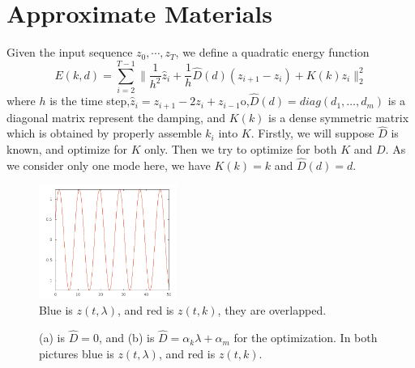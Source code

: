 \documentclass[twocolumn,a4paper]{article}
\begin{document}
\section{Approximate Materials}
Given the input sequence $z_0,\cdots,z_T$, we define a quadratic energy function
\begin{equation} \label{qua-en}
  E(k,d) = \sum_{i=2}^{T-1} \|\frac{1}{h^2}\hat{z}_i+\frac{1}{h}\hat{D}(d)(z_{i+1}-z_{i})+ K(k)z_i\|_2^2
\end{equation}
where $h$ is the time step,$\hat{z}_i=z_{i+1}-2z_{i}+z_{i-1}$o,$\hat{D}(d) =
diag(d_1,\dots,d_m)$ is a diagonal matrix represent the damping, and $K(k)$ is a
dense symmetric matrix which is obtained by properly assemble $k_i$ into
$K$. Firstly, we will suppose $\hat{D}$ is known, and optimize for $K$
only. Then we try to optimize for both $K$ and $D$. As we consider only one mode
here, we have $K(k)=k$ and $\hat{D}(d)=d$.

\begin{figure}
  \centering
  \includegraphics[width=0.4\textwidth]{./figures/singleModeNoDamp.png}
  \caption{Blue is $z(t,\lambda)$, and red is $z(t,k)$, they are overlapped.}
  \label{singleModeNoCon}
\end{figure}
\begin{figure}
  \centering
  \caption{(a) is $\hat{D}=0$, and (b) is $\hat{D}=\alpha_k\lambda+\alpha_m$ for
    the optimization. In both pictures blue is $z(t,\lambda)$, and red is
    $z(t,k)$.}
  \label{singleModeD}
\end{figure}
\end{document}
